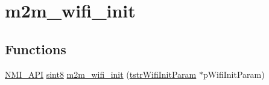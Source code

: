\hypertarget{group__WifiInitFn}{}\section{m2m\+\_\+wifi\+\_\+init}
\label{group__WifiInitFn}
\subsection*{Functions}
\begin{DoxyCompactItemize}
\item 
\hyperlink{group__BSPDefine_gaecc0323d771e41ef81a76b5f12783e22}{N\+M\+I\+\_\+\+A\+PI} \hyperlink{group__DataT_gae35f10ffd0ac8dd2bc3e794da9bdfbc7}{sint8} \hyperlink{group__WifiInitFn_ga73c734812e844d96d860c4e93e9daf35}{m2m\+\_\+wifi\+\_\+init} (\hyperlink{structtstrWifiInitParam}{tstr\+Wifi\+Init\+Param} $\ast$p\+Wifi\+Init\+Param)
\end{DoxyCompactItemize}


